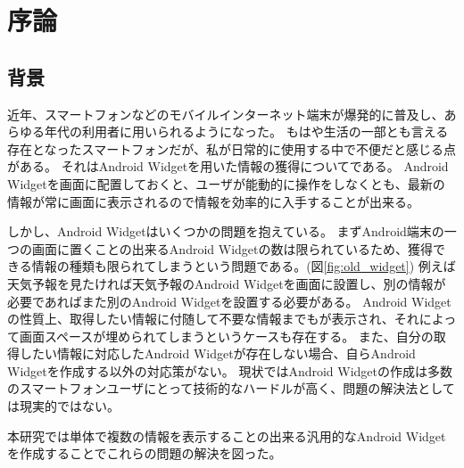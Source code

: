\chapter{序論}
\label{chap:introduction}
\section{背景}


近年、スマートフォンなどのモバイルインターネット端末が爆発的に普及し、あらゆる年代の利用者に用いられるようになった。
もはや生活の一部とも言える存在となったスマートフォンだが、私が日常的に使用する中で不便だと感じる点がある。
それはAndroid Widgetを用いた情報の獲得についてである。
Android Widgetを画面に配置しておくと、ユーザが能動的に操作をしなくとも、最新の情報が常に画面に表示されるので情報を効率的に入手することが出来る。

しかし、Android Widgetはいくつかの問題を抱えている。
まずAndroid端末の一つの画面に置くことの出来るAndroid Widgetの数は限られているため、獲得できる情報の種類も限られてしまうという問題である。(図\ref{fig:old_widget})
例えば天気予報を見たければ天気予報のAndroid Widgetを画面に設置し、別の情報が必要であればまた別のAndroid Widgetを設置する必要がある。
Android Widgetの性質上、取得したい情報に付随して不要な情報までもが表示され、それによって画面スペースが埋められてしまうというケースも存在する。
また、自分の取得したい情報に対応したAndroid Widgetが存在しない場合、自らAndroid Widgetを作成する以外の対応策がない。
現状ではAndroid Widgetの作成は多数のスマートフォンユーザにとって技術的なハードルが高く、問題の解決法としては現実的ではない。

本研究では単体で複数の情報を表示することの出来る汎用的なAndroid Widgetを作成することでこれらの問題の解決を図った。


